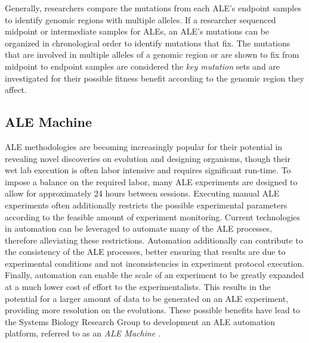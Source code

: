 \documentclass[12pt,final,masters,chapterheads]{ucsd}  %
\begin{document}
Generally, researchers compare the mutations from each ALE's endpoint samples to identify genomic regions with multiple alleles. If a researcher sequenced midpoint or intermediate samples for ALEs, an ALE's mutations can be organized in chronological order to identify mutations that fix. The mutations that are involved in multiple alleles of a genomic region or are shown to fix from midpoint to endpoint samples are considered the \textit{key mutation} sets and are investigated for their possible fitness benefit according to the genomic region they affect.


\subsection{ALE Machine}

ALE methodologies are becoming increasingly popular for their potential in revealing novel discoveries on evolution and designing organisms, though their wet lab execution is often labor intensive and requires significant run-time. To impose a balance on the required labor, many ALE experiments are designed to allow for approximately 24 hours between sessions. Executing manual ALE experiments often additionally restricts the possible experimental parameters according to the feasible amount of experiment monitoring. Current technologies in automation can be leveraged to automate many of the ALE processes, therefore alleviating these restrictions. Automation additionally can contribute to the consistency of the ALE processes, better ensuring that results are due to experimental conditions and not inconsistencies in experiment protocol execution. Finally, automation can enable the scale of an experiment to be greatly expanded at a much lower cost of effort to the experimentalists. This results in the potential for a larger amount of data to be generated on an ALE experiment, providing more resolution on the evolutions. These possible benefits have lead to the Systems Biology Research Group to development an ALE automation platform, referred to as an \textit{ALE Machine} \cite{ryan_thesis}.
\end{document}
